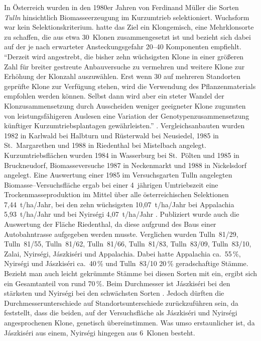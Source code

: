 \documentclass[twocolumn]{scrartcl}
\begin{document}
In Österreich wurden in den 1980er Jahren von Ferdinand Müller die
Sorten \emph{Tulln} hinsichtlich Biomasseerzeugung im Kurzumtrieb
selektioniert. Wuchsform war kein
Selektionskriterium. \citet{mueller1999robinie} hatte das Ziel ein
Klongemisch, eine Mehrklonsorte zu schaffen, die aus etwa 30~Klonen
zusammengesetzt ist und bezieht sich dabei auf
\citet{huehn1986klonanazahl} der je nach erwarteter Ansteckungsgefahr
20--40 Komponenten empfiehlt.
\enquote{Derzeit wird angestrebt, die
  bisher zehn wüchsigsten Klone in einer größeren Zahl für breiter
  gestreute Anbauversuche zu vermehren und weitere Klone zur Erhöhung
  der Klonzahl auszuwählen. Erst wenn 30 auf mehreren Standorten
  geprüfte Klone zur Verfügung stehen, wird die Verwendung des
  Pflanzenmaterials empfohlen werden können. Selbst dann wird aber ein
  steter Wandel der Klonzusammensetzung durch Ausscheiden weniger
  geeigneter Klone zugunsten von leistungsfähigeren Auslesen eine
  Variation der Genotypenzusammensetzung künftiger
  Kurzumtriebsplantagen gewährleisten.} \citep{mueller1999robinie}.
Vergleichsanbauten wurden 1982 in Karlwald bei Halbturn und Rüsterwald
bei Neusiedel, 1985 in St.~Margarethen und 1988 in Riedenthal bei
Mistelbach angelegt. Kurzumtriebsflächen wurden 1984 in Wasserburg bei
St.~Pölten und 1985 in Bruckneudorf, Biomasseversuche 1987 in
Neckenmarkt und 1988 in Nickelsdorf angelegt.  Eine Auswertung einer
1985 im Versuchsgarten Tulln angelegten Biomasse--Versuchsfläche ergab
bei einer 4~jährigen Umtriebszeit eine Trockenmasseproduktion im
Mittel über alle österreichischen Selektionen 7,44~t/ha/Jahr, bei den
zehn wüchsigsten 10,07~t/ha/Jahr bei Appalachia 5,93~t/ha/Jahr und bei
Nyirségi 4,07~t/ha/Jahr \citep{mueller1991robinie}.  Publiziert wurde
auch die Auswertung der Fläche Riedenthal, da diese aufgrund des Baus
einer Autobahntrasse aufgegeben werden musste. Verglichen wurden
Tulln~81/29, Tulln~81/55, Tulln~81/62, Tulln~81/66, Tulln~81/83,
Tulln~83/09, Tulln~83/10, Zalai, Nyirségi, Jászkiséri und
Appalachia. Dabei hatte Appalachia ca.\ 55\,\%, Nyirségi und
Jászkiséri ca.\ 40\,\% und Tulln~83/10 20\,\% geradschaftige Stämme.
Bezieht man auch leicht gekrümmte Stämme bei diesen Sorten mit ein,
ergibt sich ein Gesamtanteil von rund 70\,\%.  Beim Durchmesser ist
Jászkiséri bei den stärksten und Nyirségi bei den schwächsten Sorten
\citep{schueler2006robinie}. Jedoch dürften die
Durchmesserunterschiede auf Standortsunterschiede zurückzuführen sein,
da \citet{heinze2014robinie} feststellt, dass die beiden, auf der
Versuchsfläche als Jászkiséri und Nyirségi angesprochenen Klone,
genetisch übereinstimmen. Was umso erstaunlicher ist, da Jászkiséri
aus einem, Nyirségi hingegen aus 6~Klonen besteht.
\end{document}
